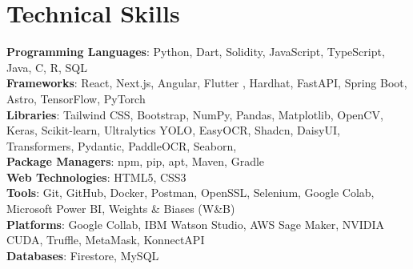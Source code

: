 \section{Technical Skills}
\begin{itemize}[leftmargin=0.15in, label={}]
    \small{\item{
        \textbf{Programming Languages}: Python, Dart, Solidity, JavaScript, TypeScript, Java, C, R, SQL \\
        \textbf{Frameworks}: React, Next.js, Angular, Flutter , Hardhat, FastAPI, Spring Boot, Astro, TensorFlow, PyTorch \\
        \textbf{Libraries}: Tailwind CSS, Bootstrap, NumPy, Pandas, Matplotlib, OpenCV, Keras, Scikit-learn, Ultralytics YOLO, EasyOCR, Shadcn, DaisyUI, Transformers, Pydantic, PaddleOCR, Seaborn,  \\
        \textbf{Package Managers}: npm, pip, apt, Maven, Gradle \\
        \textbf{Web Technologies}: HTML5, CSS3 \\
        \textbf{Tools}: Git, GitHub, Docker, Postman, OpenSSL, Selenium, Google Colab, Microsoft Power BI, Weights \& Biases (W\&B) \\
        \textbf{Platforms}: Google Collab, IBM Watson Studio, AWS Sage Maker, NVIDIA CUDA, Truffle, MetaMask, KonnectAPI \\
        \textbf{Databases}: Firestore, MySQL\\
    }}
\end{itemize}
